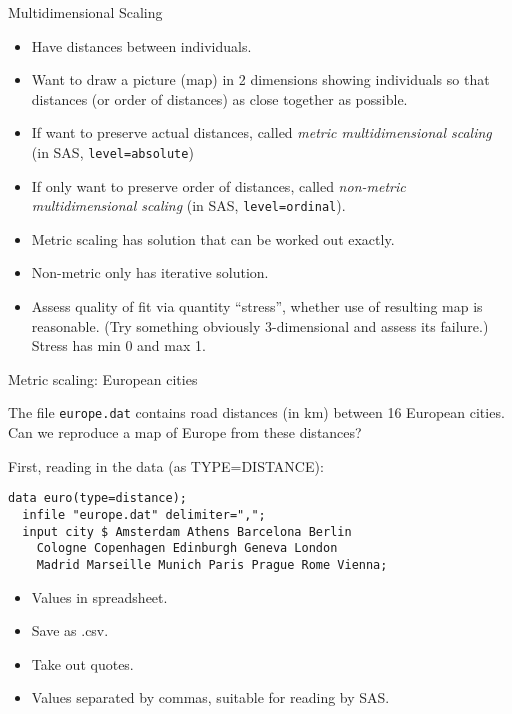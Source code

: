 \documentclass[pdf]{prosper}
\begin{document}
\begin{slide}{Multidimensional Scaling}

  \begin{itemize}
  \item Have distances between individuals.
  \item Want to draw a picture (map) in 2 dimensions showing individuals so that distances (or order of distances) as close together as possible.
  \item If want to preserve actual distances, called {\em metric multidimensional scaling} (in SAS, \verb-level=absolute-)
  \item If only want to preserve order of distances, called {\em non-metric multidimensional scaling} (in SAS, \verb-level=ordinal-).
  \item Metric scaling has solution that can be worked out exactly.
  \item Non-metric only has iterative solution.
  \item Assess quality of fit via quantity ``stress'', whether use of resulting map is reasonable. (Try something obviously 3-dimensional and assess its failure.) Stress has min 0 and max 1.
  \end{itemize}

\end{slide}


\begin{slide}{Metric scaling: European cities}

The file \verb-europe.dat- contains road distances (in km) between 16 European cities. Can we reproduce a map of Europe from these distances?

\vspace{3ex}

First, reading in the data (as TYPE=DISTANCE):

\begin{verbatim}
data euro(type=distance);
  infile "europe.dat" delimiter=",";
  input city $ Amsterdam Athens Barcelona Berlin 
    Cologne Copenhagen Edinburgh Geneva London 
    Madrid Marseille Munich Paris Prague Rome Vienna;
\end{verbatim}

\begin{itemize}
\item Values in spreadsheet.
\item Save as .csv.
\item Take out quotes.
\item Values separated by commas, suitable for reading by SAS.
\end{itemize}

\end{slide}
\end{document}
